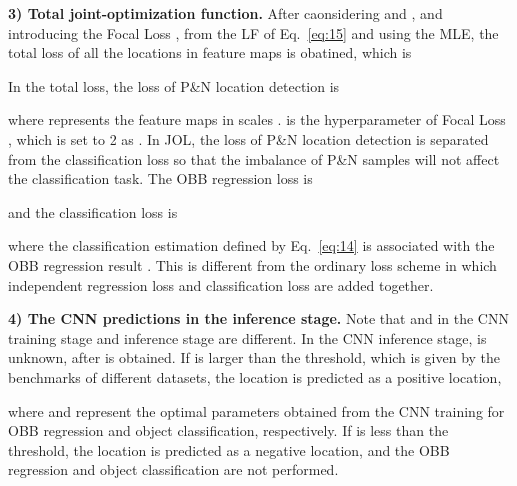 \textbf{3) Total joint-optimization function.} After caonsidering  and , and introducing the Focal Loss \cite{linFocalLossDense2017}, from the LF of Eq.~\ref{eq:15} and using the MLE, the total loss of all the locations in feature maps is obatined, which is 

In the total loss, the loss of P\&N location detection is

where  represents the feature maps in scales .  is the hyperparameter of Focal Loss \cite{linFocalLossDense2017}, which is set to 2 as \cite{linFocalLossDense2017}. In JOL, the loss of P\&N location detection is separated from the classification loss so that the imbalance of P\&N samples will not affect the classification task. The OBB regression loss is

and the classification loss is

where the classification estimation  defined by Eq.~\ref{eq:14} is associated with the OBB regression result . This is different from the ordinary loss scheme in which independent regression loss and classification loss are added together.

\textbf{4) The CNN predictions in the inference stage.} Note that  and  in the CNN training stage and inference stage are different. In the CNN inference stage,  is unknown, after  is obtained. If  is larger than the threshold, which is given by the benchmarks of different datasets, the location is predicted as a positive location,


where   and  represent the optimal parameters obtained from the CNN training for OBB regression and object classification, respectively. If  is less than the threshold, the location is predicted as a negative location, and the OBB regression and object classification are not performed.
